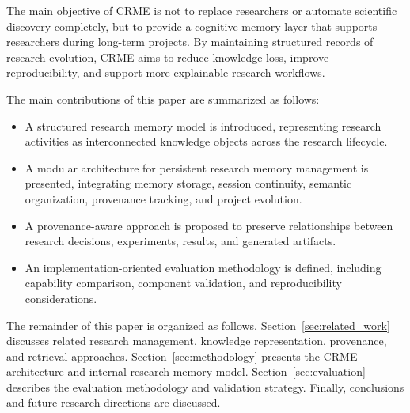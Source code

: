 The main objective of CRME is not to replace researchers or automate
scientific discovery completely, but to provide a cognitive memory layer
that supports researchers during long-term projects. By maintaining
structured records of research evolution, CRME aims to reduce knowledge
loss, improve reproducibility, and support more explainable research
workflows.


The main contributions of this paper are summarized as follows:

\begin{itemize}

\item A structured research memory model is introduced, representing
research activities as interconnected knowledge objects across the
research lifecycle.

\item A modular architecture for persistent research memory management is
presented, integrating memory storage, session continuity, semantic
organization, provenance tracking, and project evolution.

\item A provenance-aware approach is proposed to preserve relationships
between research decisions, experiments, results, and generated
artifacts.

\item An implementation-oriented evaluation methodology is defined,
including capability comparison, component validation, and reproducibility
considerations.

\end{itemize}


The remainder of this paper is organized as follows.
Section~\ref{sec:related_work} discusses related research management,
knowledge representation, provenance, and retrieval approaches.
Section~\ref{sec:methodology} presents the CRME architecture and internal
research memory model.
Section~\ref{sec:evaluation} describes the evaluation methodology and
validation strategy.
Finally, conclusions and future research directions are discussed.



